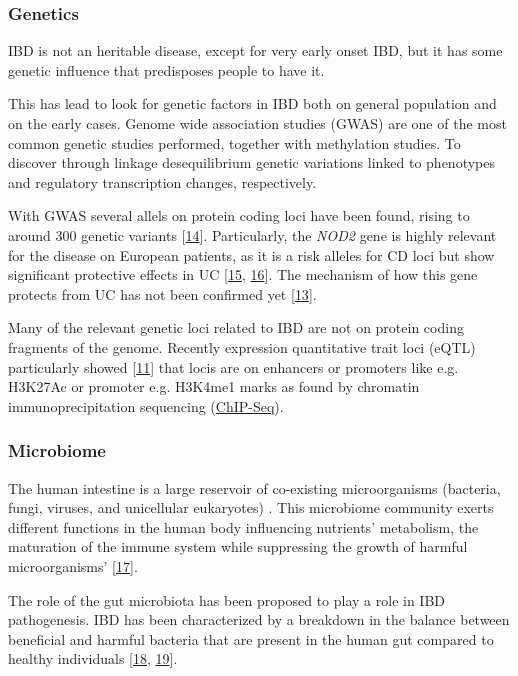 \documentclass[
  12pt,
  a4paper,
  twoside,
  openright]{book}
\begin{document}
\hypertarget{genetics}{%
\subsubsection{Genetics}\label{genetics}}

IBD is not an heritable disease, except for very early onset IBD, but it has some genetic influence that predisposes people to have it.

This has lead to look for genetic factors in IBD both on general population and on the early cases.
Genome wide association studies (GWAS) are one of the most common genetic studies performed, together with methylation studies.
To discover through linkage desequilibrium genetic variations linked to phenotypes and regulatory transcription changes, respectively.

With GWAS several allels on protein coding loci have been found, rising to around 300 genetic variants {[}\protect\hyperlink{ref-kumar2019}{14}{]}.
Particularly, the \emph{NOD2} gene is highly relevant for the disease on European patients, as it is a risk alleles for CD loci but show significant protective effects in UC {[}\protect\hyperlink{ref-jostins2012}{15}, \protect\hyperlink{ref-momozawa2018}{16}{]}.
The mechanism of how this gene protects from UC has not been confirmed yet {[}\protect\hyperlink{ref-horowitz2021}{13}{]}.

Many of the relevant genetic loci related to IBD are not on protein coding fragments of the genome.
Recently expression quantitative trait loci (eQTL) particularly showed {[}\protect\hyperlink{ref-mcgovern2015}{11}{]} that locis are on enhancers or promoters like e.g.
H3K27Ac or promoter e.g.
H3K4me1 marks as found by chromatin immunoprecipitation sequencing (\href{https://en.wikipedia.org/wiki/ChIP_sequencing}{ChIP-Seq}).

\hypertarget{microbiome}{%
\subsubsection{Microbiome}\label{microbiome}}

The human intestine is a large reservoir of co-existing microorganisms (bacteria, fungi, viruses, and unicellular eukaryotes) .
This microbiome community exerts different functions in the human body influencing nutrients' metabolism, the maturation of the immune system while suppressing the growth of harmful microorganisms' {[}\protect\hyperlink{ref-khanna2014}{17}{]}.

The role of the gut microbiota has been proposed to play a role in IBD pathogenesis.
IBD has been characterized by a breakdown in the balance between beneficial and harmful bacteria that are present in the human gut compared to healthy individuals {[}\protect\hyperlink{ref-swidsinski2002}{18}, \protect\hyperlink{ref-tamboli2004}{19}{]}.
\end{document}
